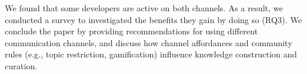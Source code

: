 We found that some developers are active on both channels. As a result, we conducted a survey to investigated the benefits they gain by doing so (RQ3). We conclude the paper by providing recommendations for using different communication channels, and discuss how channel affordances and community rules (e.g., topic restriction, gamification) influence knowledge construction and curation.



